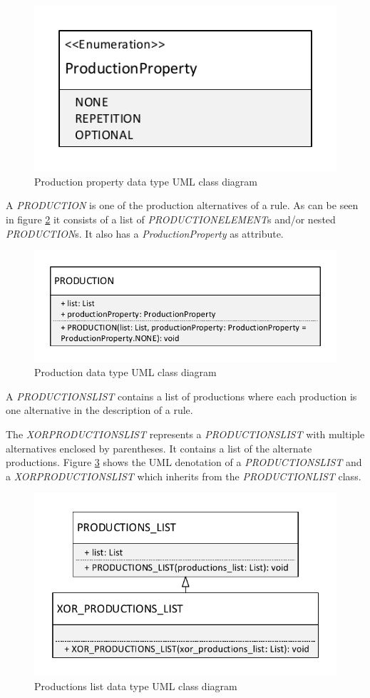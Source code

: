 \begin{figure}[H]
\centering
\includegraphics[width=.4\textwidth]{images/Concept_uml_data_types_production_property.pdf}
\caption{Production property data type UML class diagram}
\label{fig:ConceptProductionPropertyClassDiagram}
\end{figure}

A \textit{PRODUCTION} is one of the production alternatives of a rule.
As can be seen in figure \ref{fig:ConceptProductionClassDiagram} it consists of a list of \textit{PRODUCTION\textunderscore ELEMENT}s and/or nested \textit{PRODUCTION}s. It also has a \textit{ProductionProperty} as attribute.

\begin{figure}[H]
\centering
\includegraphics[width=.5\textwidth]{images/Concept_uml_data_types_production.pdf}
\caption{Production data type UML class diagram}
\label{fig:ConceptProductionClassDiagram}
\end{figure}

A \textit{PRODUCTIONS\textunderscore LIST} contains a list of productions where each production is one alternative in the description of a rule. 

The \textit{XOR\textunderscore PRODUCTIONS\textunderscore LIST} represents a \textit{PRODUCTIONS\textunderscore LIST} with multiple alternatives enclosed by parentheses. It contains a list of the alternate productions. Figure \ref{fig:ConceptProductionsListClassDiagram} shows the UML denotation of a \textit{PRODUCTIONS\textunderscore LIST} and a \textit{XOR\textunderscore PRODUCTIONS\textunderscore LIST} which inherits from the \textit{PRODUCTION\textunderscore LIST} class.

\begin{figure}[H]
\centering
\includegraphics[width=.6\textwidth]{images/Concept_uml_data_types_productions_list.pdf}
\caption{Productions list data type UML class diagram}
\label{fig:ConceptProductionsListClassDiagram}
\end{figure}



